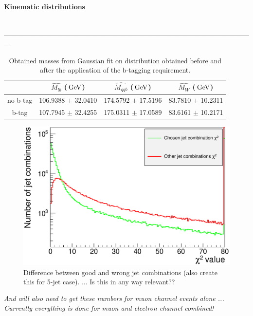 \paragraph{Kinematic distributions} \hfill \\

---------------------------------------------------------------------------------------------------------------
\\


\begin{table}[h!t]
 \centering
 \begin{tabular}{c|c|c|c}
		& $\hat{M_{lb}}$ ($\, \mathrm{GeV}$) 	& $\hat{M_{qqb}}$ ($\, \mathrm{GeV}$) 	& $\hat{M_{W}}$ ($\, \mathrm{GeV}$) 	\\
  \hline
  no b-tag 	& 106.9388 $\pm$ 32.0410 	& 174.5792 $\pm$ 17.5196 	& 83.7810 $\pm$ 10.2311 	\\
  b-tag 	& 107.7945 $\pm$ 32.4255 	& 175.0311 $\pm$ 17.0589 	& 83.6161 $\pm$ 10.2171 	
 \end{tabular}
 \caption{Obtained masses from Gaussian fit on distribution obtained before and after the application of the b-tagging requirement.}
\end{table}

\begin{figure}[h!t]
 \centering
 \includegraphics[width = 0.45 \textwidth]{Chapters/Chapter4_EvtSel/Figures/GoodVsBadChiSq_4Jets.pdf}
 \caption{Difference between good and wrong jet combinations (also create this for 5-jet case). ... Is this in any way relevant??} \label{fig::GoodVsBadChiSq}
\end{figure}

\textit{And will also need to get these numbers for muon channel events alone ... Currently everything is done for muon and electron channel combined!}

